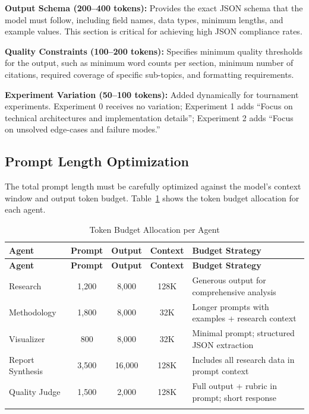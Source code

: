 \documentclass[a4paper,12pt,openany]{report}
\begin{document}
\textbf{Output Schema (200--400 tokens):} Provides the exact JSON schema that the model must follow, including field names, data types, minimum lengths, and example values. This section is critical for achieving high JSON compliance rates.

\textbf{Quality Constraints (100--200 tokens):} Specifies minimum quality thresholds for the output, such as minimum word counts per section, minimum number of citations, required coverage of specific sub-topics, and formatting requirements.

\textbf{Experiment Variation (50--100 tokens):} Added dynamically for tournament experiments. Experiment 0 receives no variation; Experiment 1 adds ``Focus on technical architectures and implementation details''; Experiment 2 adds ``Focus on unsolved edge-cases and failure modes.''

\subsection{Prompt Length Optimization}

The total prompt length must be carefully optimized against the model's context window and output token budget. Table~\ref{tab:prompt_budget} shows the token budget allocation for each agent.

\begin{longtable}{|p{2.5cm}|c|c|c|p{5.5cm}|}
\hline
\textbf{Agent} & \textbf{Prompt} & \textbf{Output} & \textbf{Context} & \textbf{Budget Strategy} \\
\hline
\endfirsthead
\hline
\textbf{Agent} & \textbf{Prompt} & \textbf{Output} & \textbf{Context} & \textbf{Budget Strategy} \\
\hline
\endhead
\hline
\endfoot
Research & 1,200 & 8,000 & 128K & Generous output for comprehensive analysis \\
\hline
Methodology & 1,800 & 8,000 & 32K & Longer prompts with examples + research context \\
\hline
Visualizer & 800 & 8,000 & 32K & Minimal prompt; structured JSON extraction \\
\hline
Report Synthesis & 3,500 & 16,000 & 128K & Includes all research data in prompt context \\
\hline
Quality Judge & 1,500 & 2,000 & 128K & Full output + rubric in prompt; short response \\
\hline

\caption{Token Budget Allocation per Agent}
\label{tab:prompt_budget}
\end{longtable}
\end{document}
